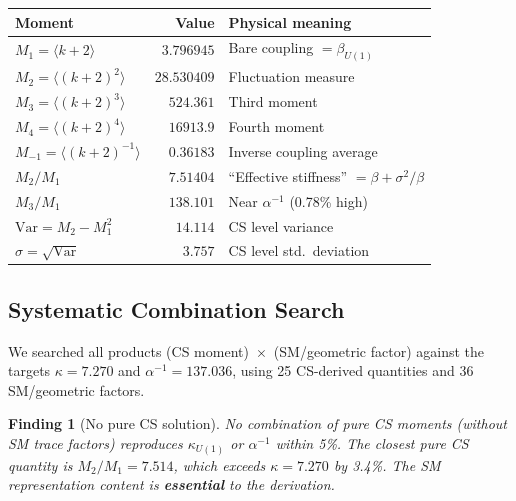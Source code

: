 \documentclass[12pt,a4paper]{article}
\newtheorem{finding}{Finding}
\theoremstyle{definition}
\theoremstyle{remark}
\begin{document}
\begin{center}
\renewcommand{\arraystretch}{1.2}
\begin{tabular}{lrl}
\toprule
\textbf{Moment} & \textbf{Value} & \textbf{Physical meaning} \\
\midrule
$M_1 = \langle k{+}2 \rangle$       & $3.796945$ & Bare coupling $= \beta_{U(1)}$ \\
$M_2 = \langle (k{+}2)^2 \rangle$   & $28.530409$ & Fluctuation measure \\
$M_3 = \langle (k{+}2)^3 \rangle$   & $524.361$ & Third moment \\
$M_4 = \langle (k{+}2)^4 \rangle$   & $16913.9$ & Fourth moment \\
$M_{-1} = \langle (k{+}2)^{-1} \rangle$ & $0.36183$ & Inverse coupling average \\
\midrule
$M_2/M_1$ & $7.51404$ & ``Effective stiffness'' $= \beta + \sigma^2/\beta$ \\
$M_3/M_1$ & $138.101$ & Near $\alpha^{-1}$ (0.78\% high) \\
\midrule
$\mathrm{Var} = M_2 - M_1^2$ & $14.114$ & CS level variance \\
$\sigma = \sqrt{\mathrm{Var}}$ & $3.757$ & CS level std.\ deviation \\
\bottomrule
\end{tabular}
\end{center}

\subsection{Systematic Combination Search}

We searched all products (CS moment)~$\times$~(SM/geometric factor)
against the targets $\kappa = 7.270$ and $\alpha^{-1} = 137.036$,
using 25 CS-derived quantities and 36 SM/geometric factors.

\begin{finding}[No pure CS solution]
\label{find:no-pure-CS}
No combination of pure CS moments (without SM trace factors)
reproduces $\kappa_{U(1)}$ or $\alpha^{-1}$ within 5\%.
The closest pure CS quantity is $M_2/M_1 = 7.514$, which exceeds
$\kappa = 7.270$ by 3.4\%.  The SM representation content is
\textbf{essential} to the derivation.
\end{finding}
\end{document}
